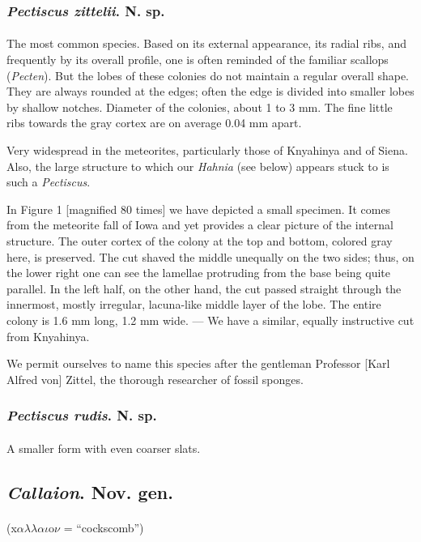 \documentclass[a4paper, 12pt, oneside]{article}
\begin{document}
\subsubsection{\emph{Pectiscus zittelii}. N. sp.}
\paragraph{}
The most common species. Based on its external appearance, its radial ribs, and frequently by its overall profile, one is often reminded of the familiar scallops (\emph{Pecten}). But the lobes of these colonies do not maintain a regular overall shape. They are always rounded at the edges; often the edge is divided into smaller lobes by shallow notches. Diameter of the colonies, about 1 to 3 mm. The fine little ribs towards the gray cortex are on average 0.04 mm apart.

Very widespread in the meteorites, particularly those of Knyahinya and of Siena. Also, the large structure to which our \emph{Hahnia} (see below) appears stuck to is such a \emph{Pectiscus}.

In Figure 1 [magnified 80 times] we have depicted a small specimen. It comes from the meteorite fall of Iowa and yet provides a clear picture of the internal structure. The outer cortex of the colony at the top and bottom, colored gray here, is preserved. The cut shaved the middle unequally on the two sides; thus, on the lower right one can see the lamellae protruding from the base being quite parallel. In the left half, on the other hand, the cut passed straight through the innermost, mostly irregular, lacuna-like middle layer of the lobe. The entire colony is 1.6 mm long, 1.2 mm wide. --- We have a similar, equally instructive cut from Knyahinya.

We permit ourselves to name this species after the gentleman Professor [Karl Alfred von] Zittel, the thorough researcher of fossil sponges.
\subsubsection{\emph{Pectiscus rudis}. N. sp.}
\paragraph{}
A smaller form with even coarser slats.
\subsection{\emph{Callaion}. Nov. gen.}
\paragraph{}
(x$\alpha\lambda\lambda\alpha\iota$o$\nu$ = ``cockscomb'')%
\end{document}
